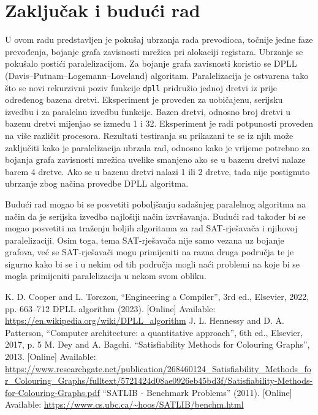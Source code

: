 \documentclass[hidelinks, conference]{IEEEtran}
\begin{document}
\section{Zaključak i budući rad}

U ovom radu predstavljen je pokušaj ubrzanja rada prevodioca, točnije jedne faze prevođenja, bojanje grafa zavisnosti mrežica pri alokaciji registara. Ubrzanje se pokušalo postići paralelizacijom. Za bojanje grafa zavisnosti koristio se DPLL (Davis–Putnam–Logemann–Loveland) algoritam. Paralelizacija je ostvarena tako što se novi rekurzivni poziv funkcije \texttt{dpll} pridružio jednoj dretvi iz prije određenog bazena dretvi. Eksperiment je proveden za uobičajenu, serijsku izvedbu i za paralelnu izvedbu funkcije. Bazen dretvi, odnosno broj dretvi u bazenu dretvi mijenjao se između 1 i 32. Eksperiment je radi potpunosti proveden na više različit procesora. Rezultati testiranja su prikazani te se iz njih može zaključiti kako je paralelizacija ubrzala rad, odnosno kako je vrijeme potrebno za bojanja grafa zavisnosti mrežica uvelike smanjeno ako se u bazenu dretvi nalaze barem 4 dretve. Ako se u bazenu dretvi nalazi 1 ili 2 dretve, tada nije postignuto ubrzanje zbog načina provedbe DPLL algoritma.

Budući rad mogao bi se posvetiti poboljšanju sadašnjeg paralelnog algoritma na način da je serijska izvedba najlošiji način izvršavanja. Budući rad također bi se mogao posvetiti na traženju boljih algoritama za rad SAT-rješavača i njihovoj paralelizaciji. Osim toga, tema SAT-rješavača nije samo vezana uz bojanje grafova, već se SAT-rješavači mogu primijeniti na razna druga područja te je sigurno kako bi se i u nekim od tih područja mogli naći problemi na koje bi se mogla primijeniti paralelizacija u nekom svom obliku.

\begin{thebibliography}{00}
 K. D. Cooper and L. Torczon, ``Engineering a Compiler'', 3rd ed., Elsevier, 2022, pp. 663--712
 DPLL algorithm (2023). [Online] Available: \url{https://en.wikipedia.org/wiki/DPLL_algorithm}
 J. L. Hennessy and D. A. Patterson, ``Computer architecture: a quantitative approach'', 6th ed., Elsevier, 2017, p. 5
 M. Dey and A. Bagchi. ``Satisfiability Methods for Colouring Graphs'', 2013. [Online] Available:
\url{https://www.researchgate.net/publication/268460124_Satisfiability_Methods_for_Colouring_Graphs/fulltext/5721424d08ae0926eb45bd3f/Satisfiability-Methods-for-Colouring-Graphs.pdf}
 ``SATLIB - Benchmark Problems'' (2011). [Online] Available:
\url{https://www.cs.ubc.ca/~hoos/SATLIB/benchm.html}
\end{thebibliography}
\vspace{12pt}
\end{document}
